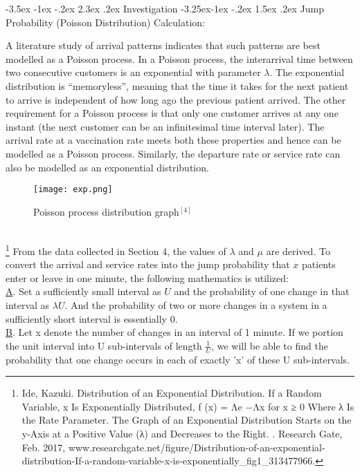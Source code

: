 \documentclass[11pt]{article}
\makeatletter
\renewcommand\section{\@startsection {section}{1}{\z@}%
                                       {-3.5ex \@plus -1ex \@minus -.2ex}%
                                       {2.3ex \@plus.2ex}%
                                       {\normalfont\fontfamily{phv}\fontsize{16}{19}\bfseries}}
\renewcommand\subsection{\@startsection{subsection}{2}{\z@}%
                                         {-3.25ex\@plus -1ex \@minus -.2ex}%
                                         {1.5ex \@plus .2ex}%
                                         {\normalfont\fontfamily{phv}\fontsize{14}{17}\bfseries}}
\makeatother
\begin{document}
 
\section{Investigation}
\subsection{Jump Probability (Poisson Distribution) Calculation:} 

A literature study of arrival patterns indicates that such patterns are best modelled as a Poisson process. In a Poisson process, the interarrival time between two consecutive customers is an exponential with parameter $\lambda$. The exponential distribution is “memoryless”, meaning that the time it takes for the next patient to arrive is independent of how long ago the previous patient arrived. The other requirement for a Poisson process is that only one customer arrives at any one instant (the next customer can be an infinitesimal time interval later). The arrival rate at a vaccination rate meets both these properties and hence can be modelled as a Poisson process. Similarly, the departure rate
or service rate can also be modelled as an exponential distribution. \\
\begin{figure}[h!]
    \centering
    \texttt{[image: exp.png]}
    \caption{Poisson process distribution graph$^{[4]}$}
    \label{exp}
\end{figure}\\
\FloatBarrier
\footnote{Ide, Kazuki. Distribution of an Exponential Distribution. If a Random Variable, x Is Exponentially Distributed, f (x) = Λe −Λx for x ≥ 0 Where λ Is the Rate Parameter. The Graph of an Exponential Distribution Starts on the y-Axis at a Positive Value (λ) and Decreases to the Right. . Research Gate, Feb. 2017, www.researchgate.net/figure/Distribution-of-an-exponential-distribution-If-a-random-variable-x-is-exponentially_fig1_313477966.}
From the data collected in Section 4, the values of $\lambda$ and $\mu$ are derived. To convert the arrival and service rates into the jump probability that $x$ patients enter or leave in one minute, the following mathematics is utilized:\\
\underline{A}. Set a sufficiently small interval as $U$ and the probability of one change in that interval as $\lambda U$. And the probability of two or more changes in a system in a sufficiently short interval is essentially 0. \\
\underline{B}. Let x denote the number of changes in an interval of 1 minute. If we portion the unit interval into U sub-intervals of length $\frac{1}{U}$, we will be able to find the probability that one change occurs in each of exactly 'x' of these U sub-intervals.\\
\end{document}
